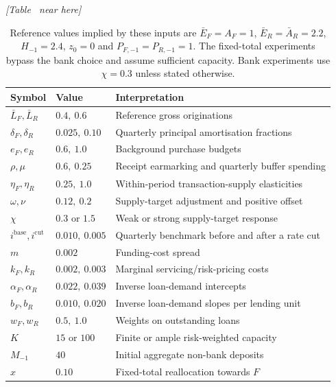 \begingroup
\def\ThisCaption{Illustrative quarterly parameters and normalisations}
\ifdefined\SeparateArtwork
\par{}\noindent\begin{minipage}{\linewidth}
\captionsetup{type=table}
\caption{\ThisCaption}
\label{tab:parameters}
\centering\small\itshape [Table \thetable\ near here]\par
\end{minipage}\par{}
\else
\begin{table}[tbp]
\centering
\caption{\ThisCaption}
\label{tab:parameters}
\small
\begin{tabularx}{\linewidth}{@{}l l X@{}}
\toprule
Symbol & Value & Interpretation\\
\midrule
$\bar L_F,\bar L_R$ & $0.4,\ 0.6$ & Reference gross originations\\
$\delta_F,\delta_R$ & $0.025,\ 0.10$ & Quarterly principal amortisation fractions\\
$e_F,e_R$ & $0.6,\ 1.0$ & Background purchase budgets\\
$\rho,\mu$ & $0.6,\ 0.25$ & Receipt earmarking and quarterly buffer spending\\
$\eta_F,\eta_R$ & $0.25,\ 1.0$ & Within-period transaction-supply elasticities\\
$\omega,\nu$ & $0.12,\ 0.2$ & Supply-target adjustment and positive offset\\
$\chi$ & $0.3$ or $1.5$ & Weak or strong supply-target response\\
$i^{\mathrm{base}},i^{\mathrm{cut}}$ & $0.010,\ 0.005$ & Quarterly benchmark before and after a rate cut\\
$m$ & $0.002$ & Funding-cost spread\\
$k_F,k_R$ & $0.002,\ 0.003$ & Marginal servicing/risk-pricing costs\\
$\alpha_F,\alpha_R$ & $0.022,\ 0.039$ & Inverse loan-demand intercepts\\
$b_F,b_R$ & $0.010,\ 0.020$ & Inverse loan-demand slopes per lending unit\\
$w_F,w_R$ & $0.5,\ 1.0$ & Weights on outstanding loans\\
$K$ & $15$ or $100$ & Finite or ample risk-weighted capacity\\
$M_{-1}$ & $40$ & Initial aggregate non-bank deposits\\
$x$ & $0.10$ & Fixed-total reallocation towards $F$\\
\bottomrule
\end{tabularx}
\caption*{Reference values implied by these inputs are $\bar E_F=A_F=1$, $\bar E_R=\bar A_R=2.2$, $H_{-1}=2.4$, $z_0=0$ and $P_{F,-1}=P_{R,-1}=1$. The fixed-total experiments bypass the bank choice and assume sufficient capacity. Bank experiments use $\chi=0.3$ unless stated otherwise.}
\end{table}
\fi
\endgroup
